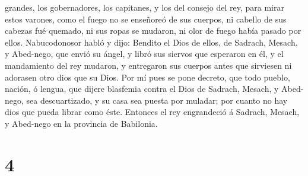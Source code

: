 grandes, los gobernadores, los capitanes, y los del consejo del rey,
para mirar estos varones, como el fuego no se enseñoreó de sus cuerpos,
ni cabello de sus cabezas fué quemado, ni sus ropas se mudaron, ni olor
de fuego había pasado por ellos.  Nabucodonosor habló y
dijo: Bendito el Dios de ellos, de Sadrach, Mesach, y Abed-nego, que
envió su ángel, y libró sus siervos que esperaron en él, y el
mandamiento del rey mudaron, y entregaron sus cuerpos antes que
sirviesen ni adorasen otro dios que su Dios.  Por mí pues
se pone decreto, que todo pueblo, nación, ó lengua, que dijere blasfemia
contra el Dios de Sadrach, Mesach, y Abed-nego, sea descuartizado, y su
casa sea puesta por muladar; por cuanto no hay dios que pueda librar
como éste.  Entonces el rey engrandeció á Sadrach,
Mesach, y Abed-nego en la provincia de Babilonia.

\hypertarget{section-3}{%
\section{4}\label{section-3}}

